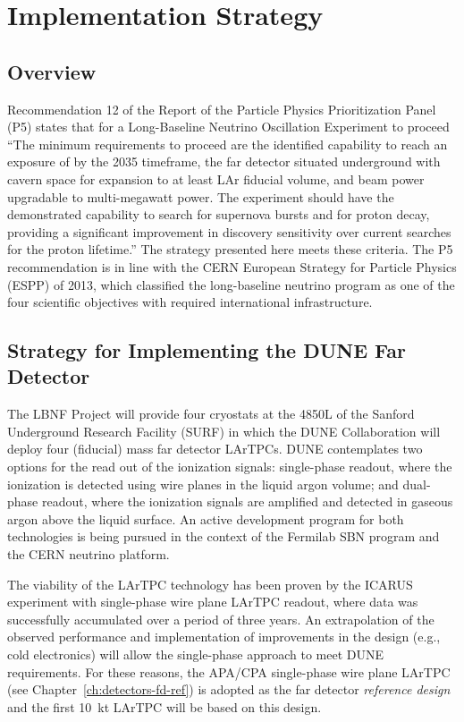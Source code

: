 \chapter{Implementation Strategy}
\label{ch:detectors-strategy}

\section{Overview}

Recommendation 12 of the Report of the Particle Physics Prioritization
Panel (P5) states that for a Long-Baseline Neutrino Oscillation
Experiment to proceed ``The minimum requirements to proceed are the
identified capability to reach an exposure of
 by the 2035 timeframe, the far detector
situated underground with cavern space for expansion to at least 
LAr fiducial volume, and  beam power upgradable to
multi-megawatt power. The experiment should have the demonstrated
capability to search for supernova bursts and for proton decay,
providing a significant improvement in discovery sensitivity over
current searches for the proton lifetime.''  The strategy presented
here meets these criteria.  The P5 recommendation is in line with the CERN
European Strategy for Particle Physics (ESPP) of 2013, which
classified the long-baseline neutrino program as one of the four
scientific objectives with required international infrastructure.

\section{Strategy for Implementing the DUNE Far Detector}
\label{sec:detectors-strategy-FD}
The LBNF Project will provide four cryostats at the 4850L of the Sanford
Underground Research Facility (SURF) in which the DUNE Collaboration
will deploy four  (fiducial) mass far detector LArTPCs. 
DUNE contemplates two options for the
read out of the ionization signals: single-phase readout, where the
ionization is detected using wire planes in the liquid argon volume;
and dual-phase readout, where the ionization signals are amplified and
detected in gaseous argon above the liquid surface.  An active
development program for both technologies is being pursued in the
context of the Fermilab SBN program and the CERN neutrino platform.

The viability of the LArTPC technology has been proven by the ICARUS
experiment with single-phase wire plane LArTPC readout, where data was
successfully accumulated over a period of three years.  An
extrapolation of the observed performance and implementation of
improvements in the design (e.g., cold electronics) will allow the
single-phase approach to meet DUNE requirements. For these reasons,
the APA/CPA single-phase wire plane LArTPC (see
Chapter~\ref{ch:detectors-fd-ref}) is adopted as the far detector
\textit{reference design} and the first 10~kt LArTPC will be based on
this design. 

